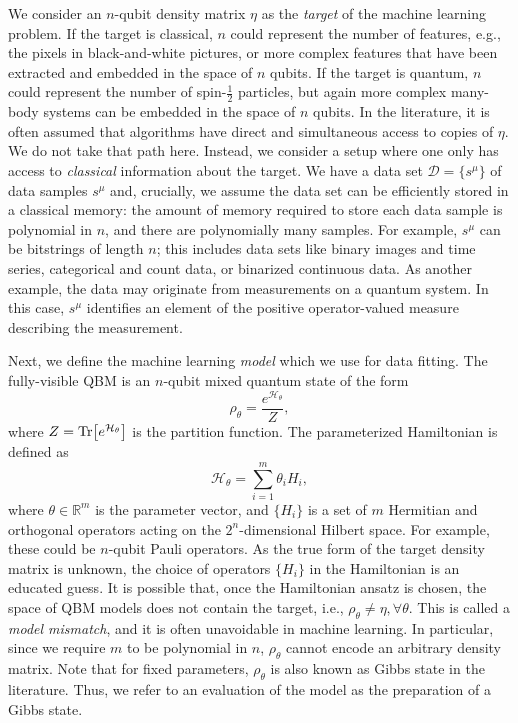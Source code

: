 \documentclass[
    reprint,
    aps,
    prx,
    longbibliography
]{revtex4-2}
\begin{document}
We consider an $n$-qubit density matrix $\eta$ as the \emph{target} of the machine learning problem. If the target is classical, $n$ could represent the number of features, e.g., the pixels in black-and-white pictures, or more complex features that have been extracted and embedded in the space of $n$ qubits. If the target is quantum, $n$ could represent the number of  spin-$\tfrac{1}{2}$ particles, but again more complex many-body systems can be embedded in the space of $n$ qubits. In the literature, it is often assumed that algorithms have direct and simultaneous access to copies of $\eta$. We do not take that path here. Instead, we consider a setup where one only has access to \emph{classical} information about the target. We have a data set $\mathcal{D} = \{s^\mu\}$ of data samples $s^\mu$ and, crucially, we assume the data set can be efficiently stored in a classical memory: the amount of memory required to store each data sample is polynomial in $n$, and there are polynomially many samples. For example, $s^\mu$ can be bitstrings of length $n$; this includes data sets like binary images and time series, categorical and count data, or binarized continuous data. As another example, the data may originate from measurements on a quantum system. In this case, $s^\mu$ identifies an element of the positive operator-valued measure describing the measurement. 

Next, we define the machine learning \emph{model} which we use for data fitting. The fully-visible QBM is an $n$-qubit mixed quantum state of the form 
\begin{equation}
    \rho_\theta = \frac{e^{\mathcal{H}_\theta}}{Z}, 
\end{equation} 
where $Z=\Tr[e^{\mathcal{H}_\theta}]$ is the partition function. The parameterized Hamiltonian is defined as 
\begin{equation}
\label{eq:generic_H}
    \mathcal{H}_\theta = \sum_{i=1}^m \theta_i H_i,
\end{equation} 
where $\theta \in \mathbb{R}^m$ is the parameter vector, and $\{H_i\}$ is a set of $m$ Hermitian and orthogonal operators acting on the $2^n$-dimensional Hilbert space. For example, these could be $n$-qubit Pauli operators. As the true form of the target density matrix is unknown, the choice of operators $\{ H_i \}$ in the Hamiltonian is an educated guess. It is possible that, once the Hamiltonian ansatz is chosen, the space of QBM models does not contain the target, i.e., $\rho_\theta \neq \eta, \forall \theta$. This is called a \emph{model mismatch}, and it is often unavoidable in machine learning. In particular, since we require $m$ to be polynomial in $n$, $\rho_\theta$ cannot encode an arbitrary density matrix. Note that for fixed parameters, $\rho_\theta$ is also known as Gibbs state in the literature. Thus, we refer to an evaluation of the model as the preparation of a Gibbs state.
\end{document}
